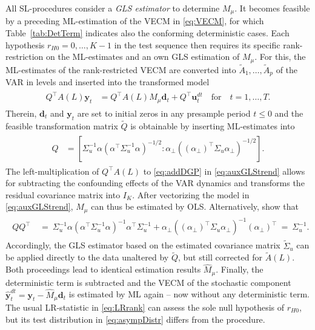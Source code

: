 All SL-procedures consider a \textit{GLS estimator} to determine $ M_\mu $. It becomes feasible by a preceding ML-estimation of the VECM in \eqref{eq:VECM}, for which Table~\ref{tab:DetTerm} indicates also the conforming deterministic cases. Each hypothesis $ r_{H0} = 0,\ldots,K-1 $ in the test sequence then requires its specific rank-restriction on the ML-estimates and an own GLS estimation of $ M_\mu $. For this, the ML-estimates of the rank-restricted VECM are converted into $ \widetilde{A}_1, \ldots , \widetilde{A}_p $ of the VAR in levels and inserted into the transformed model
\begin{align} \label{eq:auxGLStrend}
\begin{split}
	{Q}^\top {A}(L) \boldsymbol{y}_t & = {Q}^\top {A}(L) M_\mu \boldsymbol{d}_t + {Q}^\top \boldsymbol{u}^{d \! t}_{t} \quad \text{for} \quad t=1,\ldots,T.
\end{split}
\end{align}
Therein, $ \boldsymbol{d}_t $ and $ \boldsymbol{y}_{t} $ are set to initial zeros in any presample period $ t \leq 0 $ and the feasible transformation matrix $ \widetilde{Q} $ is obtainable by inserting ML-estimates into
\begin{align} \label{eq:GLStrend}
\begin{split}
	Q & = \left[ \Sigma_u^{-1} \alpha \left( \alpha^\top \Sigma_u^{-1} \alpha \right)^{-1/2} : \alpha_\perp \left( \left( \alpha_\perp \right)^\top \Sigma_u \alpha_\perp \right)^{-1/2} \right].
\end{split}
\end{align}
The left-multiplication of $ {Q}^\top {A}(L) $ to \eqref{eq:addDGP} in \eqref{eq:auxGLStrend} allows for subtracting the confounding effects of the VAR dynamics and transforms the residual covariance matrix into $ I_K $. After vectorizing the model in \eqref{eq:auxGLStrend}, $ M_\mu $ can thus be estimated by OLS. Alternatively, \citet[p. 438]{SaikkonenLutkepohl2000c} show that 
\begin{align} \label{eq:GLStrend2}
\begin{split}
	QQ^\top & \ = \ \Sigma_u^{-1} \alpha \left( \alpha^\top \Sigma_u^{-1} \alpha \right)^{-1} \alpha^\top \Sigma_u^{-1} + \alpha_\perp \left( \left( \alpha_\perp \right)^\top \Sigma_u \alpha_\perp \right)^{-1} \left( \alpha_\perp \right)^\top \ = \ \Sigma_u^{-1}.
\end{split}
\end{align} 
Accordingly, the GLS estimator based on the estimated covariance matrix $ \widetilde{\Sigma}_u $ can be applied directly to the data unaltered by $ \widetilde{Q} $, but still corrected for $ \widetilde{A}(L) $. Both proceedings lead to identical estimation results $ \widehat{M}_\mu $. Finally, the deterministic term is subtracted and the VECM of the stochastic component $ \boldsymbol{\hat{y}}^{d \! t}_{t} = \boldsymbol{y}_t - \widehat{M}_\mu \boldsymbol{d}_t $ is estimated by ML again -- now without any deterministic term. The usual LR-statistic in \eqref{eq:LRrank} can assess the sole null hypothesis of $ r_{H0} $, but its test distribution in \eqref{eq:asympDistr} differs from the \citeauthor{Johansen1988} procedure.


